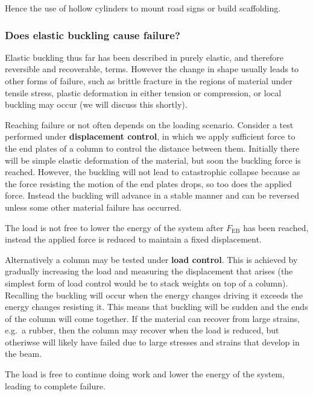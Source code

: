Hence the use of hollow cylinders to mount road signs or build scaffolding.

\subsubsection{Does elastic buckling cause failure?}

Elastic buckling thus far has been described in purely elastic, and therefore reversible and recoverable, terms. However the change in shape usually leads to other forms of failure, such as brittle fracture in the regions of material under tensile stress, plastic deformation in either tension or compression, or local buckling may occur (we will discuss this shortly).

Reaching failure or not often depends on the loading scenario. Consider a test performed under {\bf displacement control}, in which we apply sufficient force to the end plates of a column to control the distance between them. Initially there will be simple elastic deformation of the material, but soon the buckling force is reached. However, the buckling will not lead to catastrophic collapse because as the force resisting the motion of the end plates drops, so too does the applied force. Instead the buckling will advance in a stable manner and can be reversed unless some other material failure has occurred.

\begin{annotation}
The load is not free to lower the energy of the system after $F_{\text{EB}}$ has been reached, instead the applied force is reduced to maintain a fixed displacement.
\end{annotation}

Alternatively a column may be tested under {\bf load control}. This is achieved by gradually increasing the load and measuring the displacement that arises (the simplest form of load control would be to stack weights on top of a column). Recalling the buckling will occur when the energy changes driving it exceeds the energy changes resisting it. This means that buckling will be sudden and the ends of the column will come together. If the material can recover from large strains, e.g.\ a rubber, then the column may recover when the load is reduced, but otheriwse will likely have failed due to large stresses and strains that develop in the beam.

\begin{annotation}
The load is free to continue doing work and lower the energy of the system, leading to complete failure.
\end{annotation}

